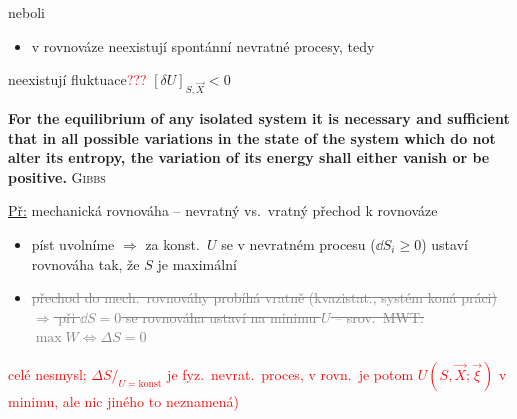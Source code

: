 neboli 
\begin{itemize}
  \item v rovnováze neexistují spontánní nevratné procesy, tedy
\end{itemize}
\begin{veta}
neexistují fluktuace\textcolor{Red}{???} \quad $[\delta U]_{S,\vec X} < 0$

\smallskip
\textbf{\small For the equilibrium of any \colorbox{Red!40}{isolated} system it is necessary and sufficient that in all possible variations in the state of the system which do not alter its entropy, the variation of its energy shall either vanish or be positive.} \hfill \textsc{Gibbs}
\end{veta}

\textcolor{NavyBlue}{\underline{Př:} mechanická rovnováha -- nevratný vs.\ vratný přechod k rovnováze}

\begin{center}
\end{center}

\textcolor{NavyBlue}{
\begin{itemize}[nosep]
  \item[a)] píst uvolníme $\Rightarrow$ za konst.\ $U$ se v nevratném procesu ($\dd S_i\geq 0$) ustaví rovnováha tak, že $S$ je maximální
  \item[b)] \textcolor{gray}{\sout{přechod do mech.\ rovnováhy probíhá vratně (kvazistat., systém koná práci) $\Rightarrow$ při $\dd S = 0$ se rovnováha ustaví na minimu $U$ -- srov.\ MWT: $\max W \Leftrightarrow \Delta S = 0$}} 
\end{itemize}}
\textcolor{Red}{\small celé nesmysl; $\Delta S/_{U=\text{konst}}$ je fyz.\ nevrat.\ proces, v rovn.\ je potom $U(S,\vec X;\vec\xi)$ v minimu, ale nic jiného to neznamená)}

